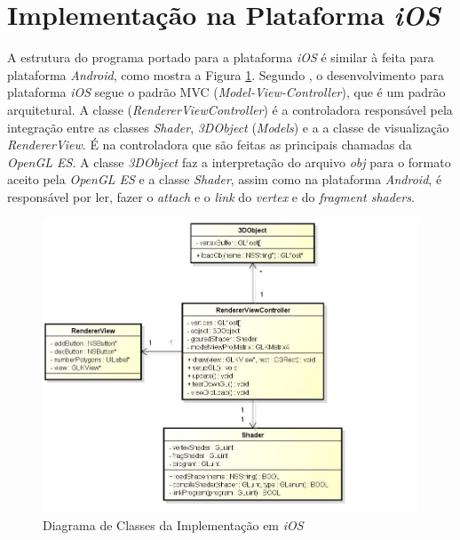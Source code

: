 	

\section{Implementação na Plataforma \textit{iOS}} 

	A estrutura do programa portado para a plataforma \textit{iOS} é similar à feita para plataforma \textit{Android}, como mostra a Figura \ref{ios_diag}. Segundo \cite{neub2013}, o desenvolvimento para plataforma \textit{iOS} segue o padrão MVC (\textit{Model-View-Controller}), que é um padrão arquitetural. A classe (\textit{RendererViewController}) é a controladora responsável pela integração entre as classes \textit{Shader}, \textit{3DObject} (\textit{Models}) e a a classe de visualização \textit{RendererView}. É na controladora que são feitas as principais chamadas da \textit{OpenGL ES}. A classe \textit{3DObject} faz a interpretação do arquivo \textit{obj} para o formato aceito pela \textit{OpenGL ES} e a classe \textit{Shader}, assim como na plataforma \textit{Android}, é responsável por ler, fazer o \textit{attach} e o \textit{link} do \textit{ vertex} e do \textit{fragment shaders}. 

	\begin{figure}[ht]
	\centering
		\includegraphics[keepaspectratio=true,scale=0.4]{figuras/ios_class_diagram.jpg}
	\caption{Diagrama de Classes da Implementação em \textit{iOS}}
	\label{ios_diag}
	\end{figure}

